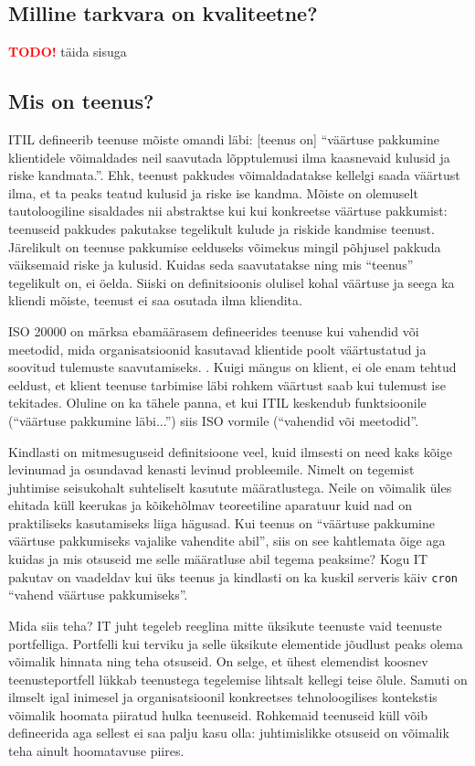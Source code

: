 \documentclass{tufte-book}
\newcommand{\TODO}{\textcolor{red}{\bf TODO!}\xspace}
\begin{document}
\subsection{Milline tarkvara on kvaliteetne?}
\TODO täida sisuga

\subsection{Mis on teenus?}
ITIL defineerib teenuse mõiste omandi läbi: [teenus on] \enquote{väärtuse pakkumine klientidele võimaldades neil saavutada lõpptulemusi ilma kaasnevaid kulusid ja riske kandmata.}\cite{itil}. Ehk, teenust pakkudes võimaldadatakse kellelgi saada väärtust ilma, et ta peaks teatud kulusid ja riske ise kandma. Mõiste on olemuselt tautoloogiline sisaldades nii abstraktse kui kui konkreetse väärtuse pakkumist: teenuseid pakkudes pakutakse tegelikult kulude ja riskide kandmise teenust. Järelikult on teenuse pakkumise eelduseks võimekus mingil põhjusel pakkuda väiksemaid riske ja kulusid. Kuidas seda saavutatakse ning mis \enquote{teenus} tegelikult on, ei öelda. Siiski on definitsioonis olulisel kohal väärtuse ja seega ka kliendi mõiste, teenust ei saa osutada ilma kliendita.

ISO 20000 on märksa ebamäärasem defineerides teenuse kui vahendid või meetodid, mida organisatsioonid kasutavad klientide poolt väärtustatud ja soovitud tulemuste saavutamiseks. \cite{iso20000}. Kuigi mängus on klient, ei ole enam tehtud eeldust, et klient teenuse tarbimise läbi rohkem väärtust saab kui tulemust ise tekitades. Oluline on ka tähele panna, et kui ITIL keskendub funktsioonile (\enquote{väärtuse pakkumine läbi...}) siis ISO vormile (\enquote{vahendid või meetodid}. 

Kindlasti on mitmesuguseid definitsioone veel, kuid ilmsesti on need kaks kõige levinumad ja osundavad kenasti levinud probleemile. Nimelt on tegemist juhtimise seisukohalt suhteliselt kasutute määratlustega. Neile on võimalik üles ehitada küll keerukas ja kõikehõlmav teoreetiline aparatuur kuid nad on praktiliseks kasutamiseks liiga hägusad. Kui teenus on \enquote{väärtuse pakkumine väärtuse pakkumiseks vajalike vahendite abil}, siis on see kahtlemata õige aga kuidas ja mis otsuseid me selle määratluse abil tegema peaksime? Kogu IT pakutav on vaadeldav kui üks teenus ja kindlasti on ka kuskil serveris käiv \texttt{cron} \enquote{vahend väärtuse pakkumiseks}. 

Mida siis teha? IT juht tegeleb reeglina mitte üksikute teenuste vaid teenuste portfelliga. Portfelli kui terviku ja selle üksikute elementide jõudlust peaks olema võimalik hinnata ning teha otsuseid. On selge, et ühest elemendist koosnev teenusteportfell lükkab teenustega tegelemise lihtsalt kellegi teise õlule. Samuti on ilmselt igal inimesel ja organisatsioonil konkreetses tehnoloogilises kontekstis võimalik hoomata piiratud hulka teenuseid. Rohkemaid teenuseid küll võib defineerida aga sellest ei saa palju kasu olla: juhtimislikke otsuseid on võimalik teha ainult hoomatavuse piires. 
\end{document}
